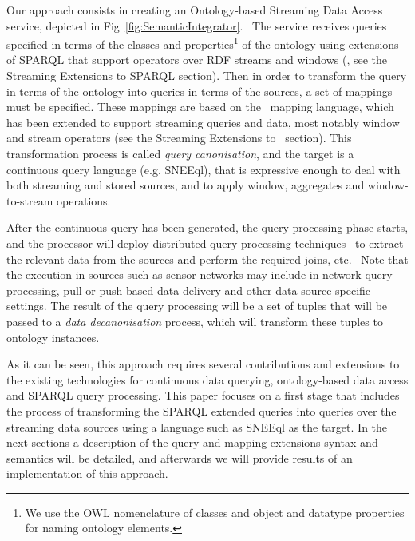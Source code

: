 Our approach consists in creating an Ontology-based Streaming Data Access service, depicted in Fig~\ref{fig:SemanticIntegrator}.\ %
The service receives queries specified in terms of the classes and properties\footnote{We use the OWL nomenclature of
classes and object and datatype properties for naming ontology elements.} of the ontology using extensions of SPARQL
that support operators over RDF streams and windows (\sparqlstr, see the Streaming Extensions to SPARQL section). %
Then in order to transform the query in terms of the ontology into queries in terms of the sources, a set of mappings must be
specified. These mappings are based on the \rtwoo\ mapping language, which has been extended to support  streaming
queries and data, most notably window and stream operators (see the Streaming Extensions to \rtwoo\ section).%
This transformation process is called \textit{query canonisation}, and the target is a continuous query language (e.g. SNEEql), that is
expressive enough to deal with both streaming and stored sources, and to apply window, aggregates and window-to-stream
operations.

After the continuous query has been generated, the query processing phase starts, and the processor will deploy distributed query processing techniques~\cite{Kossmann_00} to extract the relevant data from the sources and perform the required joins, etc.\ %
%
Note that the execution in sources such as sensor networks may include in-network query processing, pull or push based data delivery and other data source specific settings. The result of the query processing will be a set of tuples that will be passed to a \textit{data decanonisation} process, which will transform these tuples to ontology instances.

As it can be seen, this approach requires several contributions and extensions to the existing technologies for continuous data querying, ontology-based data access and SPARQL query processing. This paper focuses on a first stage that includes the process of transforming the SPARQL extended queries into queries over the streaming data sources using a language such as SNEEql as the target. In the next sections a description of the query and mapping extensions syntax and semantics will be detailed, and afterwards we will provide results of an implementation of this approach.
